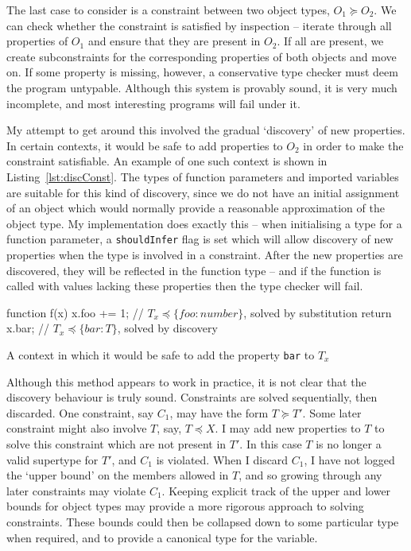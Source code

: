 \documentclass[12pt,a4paper,twoside,openright]{report}
\theoremstyle{definition}
\theoremstyle{dotless}
\newcommand*{\js}{\texttt}
\begin{document}
The last case to consider is a constraint between two object types, $O_1\succeq
O_2$. We can check whether the constraint is satisfied by inspection -- iterate
through all properties of $O_1$ and ensure that they are present in $O_2$. If
all are present, we create subconstraints for the corresponding properties of
both objects and move on.  If some property is missing, however, a conservative
type checker must deem the program untypable. Although this system is provably
sound, it is very much incomplete, and most interesting programs will fail under it.

My attempt to get around this involved the gradual `discovery' of new properties.
In certain contexts, it would be safe to add properties to $O_2$ in order to make the
constraint satisfiable. An example of one such context is shown in Listing~\ref{lst:discConst}.
The types of function parameters and imported variables are suitable for this kind of discovery, since 
we do not have an initial assignment of an object which would normally provide a reasonable
approximation of the object type. My implementation does exactly this -- when initialising a type
for a function parameter, a \js{shouldInfer} flag is set which will allow discovery 
of new properties when the type is involved in a constraint. After the new properties are 
discovered, they will be reflected in the function type -- and if the function is called with 
values lacking these properties then the type checker will fail.

\begin{listing}
  \begin{jscript}
	function f(x) {
	  x.foo += 1;   // $T_x \preceq\{foo:number\}$, solved by substitution
	  return x.bar; // $T_x \preceq\{bar:T\}$, solved by discovery
	}
  \end{jscript}
  \caption{A context in which it would be safe to add the property \js{bar} to $T_x$}
  \label{lst:discConst}
\end{listing}

Although this method appears to work in practice, it is not clear that the
discovery behaviour is truly sound. Constraints are solved sequentially, then
discarded. One constraint, say $C_1$, may have the form $T\succeq T'$. Some
later constraint might also involve $T$, say, $T\preceq X$.  I may add new
properties to $T$ to solve this constraint which are not present in $T'$. In
this case $T$ is no longer a valid supertype for $T'$, and $C_1$ is violated.
When I discard $C_1$, I have not logged the `upper bound' on the members
allowed in $T$, and so growing through any later constraints may violate $C_1$.
Keeping explicit track of the upper and lower bounds for object types may
provide a more rigorous approach to solving constraints. These bounds could
then be collapsed down to some particular type when required, and to provide a
canonical type for the variable.
\end{document}
